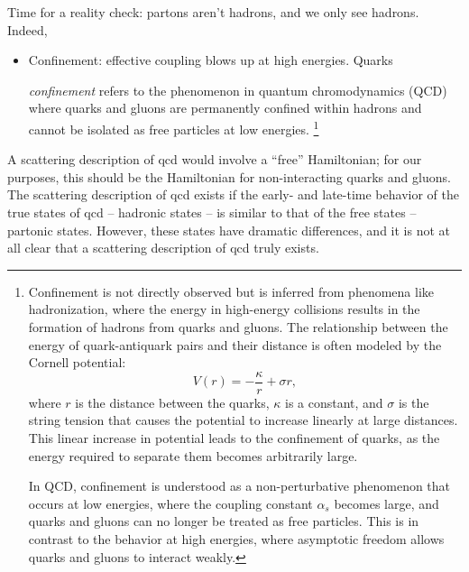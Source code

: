 Time for a reality check:
%
partons aren't hadrons, and we only see hadrons.
%
Indeed,
\begin{itemize}
    \item
Confinement:
%
effective coupling blows up at high energies.
%
Quarks

\emph{\gls{confinement}} refers to the phenomenon in quantum chromodynamics (QCD) where quarks and gluons are permanently confined within hadrons and cannot be isolated as free particles at low energies.%
\footnote{
    Confinement is not directly observed but is inferred from phenomena like hadronization, where the energy in high-energy collisions results in the formation of hadrons from quarks and gluons. The relationship between the energy of quark-antiquark pairs and their distance is often modeled by the Cornell potential:
    \begin{equation}
        V(r) = -\frac{\kappa}{r} + \sigma r,
    \end{equation}
    where \( r \) is the distance between the quarks, \( \kappa \) is a constant, and \( \sigma \) is the string tension that causes the potential to increase linearly at large distances. This linear increase in potential leads to the confinement of quarks, as the energy required to separate them becomes arbitrarily large.

    In QCD, confinement is understood as a non-perturbative phenomenon that occurs at low energies, where the coupling constant \( \alpha_s \) becomes large, and quarks and gluons can no longer be treated as free particles. This is in contrast to the behavior at high energies, where asymptotic freedom allows quarks and gluons to interact weakly.
}



\end{itemize}


A scattering description of \gls{qcd} would involve a ``free'' Hamiltonian;
%
for our purposes, this should be the Hamiltonian for non-interacting quarks and gluons.
%
The scattering description of \gls{qcd} exists if the early- and late-time behavior of the true states of \gls{qcd} -- hadronic states -- is similar to that of the free states -- partonic states.
%
However, these states have dramatic differences, and it is not at all clear that a scattering description of \gls{qcd} truly exists.


